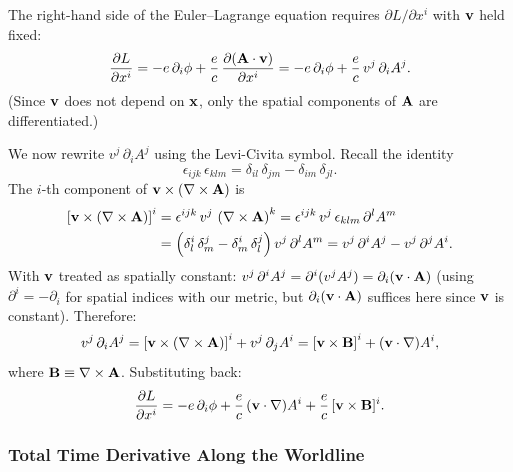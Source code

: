 The right-hand side of the Euler--Lagrange equation requires $\partial L/\partial x^i$
with $\mathbf{v}$ held fixed:
\begin{equation}\label{eq:lec07:dLdx-raw}
    \frac{\partial L}{\partial x^i}
    = -e\,\partial_i\phi + \frac{e}{c}\,\frac{\partial(\mathbf{A}\cdot\mathbf{v})}{\partial x^i}
    = -e\,\partial_i\phi + \frac{e}{c}\,v^j\,\partial_i A^j .
\end{equation}
(Since $\mathbf{v}$ does not depend on $\mathbf{x}$, only the spatial components of
$\mathbf{A}$ are differentiated.)

We now rewrite $v^j\,\partial_i A^j$ using the Levi-Civita symbol.  Recall
the identity
\begin{equation}\label{eq:lec07:levi-civita-id}
    \epsilon_{ijk}\,\epsilon_{klm} = \delta_{il}\,\delta_{jm} - \delta_{im}\,\delta_{jl} .
\end{equation}
The $i$-th component of $\mathbf{v}\times(\nabla\times\mathbf{A})$ is
\begin{align}
    \left[\mathbf{v}\times(\nabla\times\mathbf{A})\right]^i
    &= \epsilon^{ijk}\,v^j\,\left(\nabla\times\mathbf{A}\right)^k
     = \epsilon^{ijk}\,v^j\,\epsilon_{klm}\,\partial^l A^m \notag \\
    &= \left(\delta^i_l\,\delta^j_m - \delta^i_m\,\delta^j_l\right)v^j\,\partial^l A^m
     = v^j\,\partial^i A^j - v^j\,\partial^j A^i .
    \label{eq:lec07:cross-expand}
\end{align}
With $\mathbf{v}$ treated as spatially constant:
$v^j\,\partial^i A^j = \partial^i(v^j A^j) = \partial_i(\mathbf{v}\cdot\mathbf{A})$ (using
$\partial^i = -\partial_i$ for spatial indices with our metric, but $\partial_i(\mathbf{v}\cdot\mathbf{A})$
suffices here since $\mathbf{v}$ is constant).  Therefore:
\begin{equation}\label{eq:lec07:cross-identity}
    v^j\,\partial_i A^j
    = \left[\mathbf{v}\times(\nabla\times\mathbf{A})\right]^i + v^j\,\partial_j A^i
    = \left[\mathbf{v}\times\mathbf{B}\right]^i + (\mathbf{v}\cdot\nabla)A^i ,
\end{equation}
where $\mathbf{B} \equiv \nabla\times\mathbf{A}$.  Substituting back:
\begin{equation}\label{eq:lec07:dLdx-final}
    \frac{\partial L}{\partial x^i}
    = -e\,\partial_i\phi + \frac{e}{c}\,(\mathbf{v}\cdot\nabla)A^i + \frac{e}{c}\,[\mathbf{v}\times\mathbf{B}]^i .
\end{equation}

\subsubsection*{Total Time Derivative Along the Worldline}

